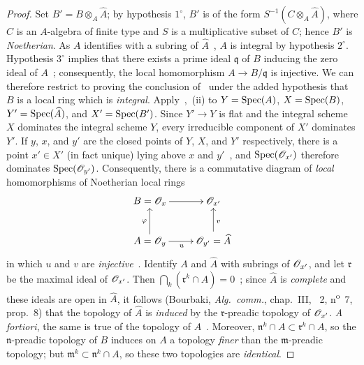 \begin{proof}
Set $B'=B\otimes_A\widehat{A}$; by hypothesis $1^\circ$, $B'$ is of the form $S^{-1}(C\otimes_A\widehat{A})$, where $C$ is an $A$-algebra of finite type and $S$ is a multiplicative subset of $C$; hence $B'$ is \emph{Noetherian}.
As $A$ identifies with a subring of $\widehat{A}$~, $A$ is integral by hypothesis $2^\circ$.
Hypothesis $3^\circ$ implies that there exists a prime ideal $\mathfrak{q}$ of $B$ inducing the zero ideal of $A$~; consequently, the local homomorphism $A\to B/\mathfrak{q}$ is injective.
We can therefore restrict to proving the conclusion of~ under the added hypothesis that $B$ is a local ring which is \emph{integral}.
Apply~,~(ii) to $Y=\operatorname{Spec}(A)$, $X=\operatorname{Spec}(B)$, $Y'=\operatorname{Spec}(\widehat{A})$, and $X'=\operatorname{Spec}(B')$.
Since $Y'\to Y$ is flat and the integral scheme $X$ dominates the integral scheme $Y$, every irreducible component of $X'$ dominates $Y'$.
If $y$, $x$, and $y'$ are the closed points of $Y$, $X$, and $Y'$ respectively, there is a point $x'\in X'$ (in fact unique) lying above $x$ and $y'$~, and $\operatorname{Spec}(\mathscr{O}_{x'})$ therefore dominates $\operatorname{Spec}(\mathscr{O}_{y'})$.
Consequently, there is a commutative diagram of \emph{local} homomorphisms of Noetherian local rings
\[
\xymatrix{
  B=\sh{O}_x \ar[r] & \sh{O}_{x'}\\
  A=\sh{O}_y \ar[u]^{\varphi} \ar[r]_{u} & \sh{O}_{y'}=\widehat{A} \ar[u]_{v}
}
\]
in which $u$ and $v$ are \emph{injective}~.
Identify $A$ and $\widehat{A}$ with subrings of $\mathscr{O}_{x'}$, and let $\mathfrak{r}$ be the maximal ideal of $\mathscr{O}_{x'}$.
Then $\bigcap_k(\mathfrak{r}^k\cap\widehat{A})=0$~; since $\widehat{A}$ is \emph{complete} and these ideals are open in $\widehat{A}$, it follows (Bourbaki, \emph{Alg.~comm.}, chap.~III, \textsection~2, n\textsuperscript{o}~7, prop.~8) that the topology of $\widehat{A}$ is \emph{induced} by the $\mathfrak{r}$-preadic topology of $\mathscr{O}_{x'}$.
\emph{A fortiori}, the same is true of the topology of $A$~.
Moreover, $\mathfrak{n}^k\cap A\subset\mathfrak{r}^k\cap A$, so the $\mathfrak{n}$-preadic topology of $B$ induces on $A$ a topology \emph{finer} than the $\mathfrak{m}$-preadic topology; but $\mathfrak{m}^k\subset\mathfrak{n}^k\cap A$, so these two topologies are \emph{identical}.
\end{proof}

